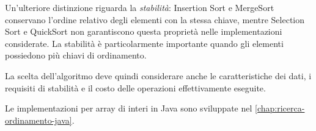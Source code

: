 Un'ulteriore distinzione riguarda la \emph{stabilità}:
Insertion Sort e MergeSort conservano l'ordine relativo degli
elementi con la stessa chiave, mentre Selection Sort e QuickSort
non garantiscono questa proprietà nelle implementazioni considerate.
La stabilità è particolarmente importante quando gli elementi
possiedono più chiavi di ordinamento.

La scelta dell'algoritmo deve quindi considerare anche le
caratteristiche dei dati, i requisiti di stabilità e il costo
delle operazioni effettivamente eseguite.

Le implementazioni per array di interi in Java sono sviluppate
nel \cref{chap:ricerca-ordinamento-java}.
